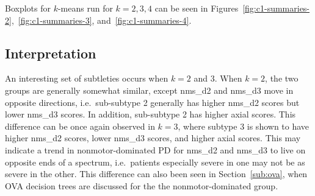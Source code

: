 \documentclass[letterpaper,12pt]{article}
\begin{document}
Boxplots for $k$-means run for $k = 2, 3, 4$ can
be seen in Figures~\ref{fig:c1-summaries-2},~\ref{fig:c1-summaries-3},
and~\ref{fig:c1-summaries-4}.

\subsection{Interpretation}
\label{sub:nms-interp}

An interesting set of subtleties occurs when $k = 2$ and 3. When $k = 2$, the
two groups
are generally somewhat similar, except nms\_d2 and nms\_d3 move in opposite
directions, i.e.\ sub-subtype 2 generally has higher nms\_d2 scores but lower
nms\_d3 scores. In addition, sub-subtype 2 has higher axial scores. This
difference can be once again observed in $k = 3$, where subtype 3 is shown to
have higher nms\_d2 scores, lower nms\_d3 scores, and higher axial scores. This
may indicate a trend in nonmotor-dominated PD for nms\_d2 and nms\_d3 to live
on opposite ends of a spectrum, i.e.\ patients especially severe in one may not
be as severe in the other. This difference can also been seen in
Section~\ref{sub:ova}, when OVA decision trees are discussed for the the
nonmotor-dominated group.
\end{document}
